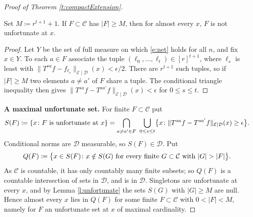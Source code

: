 \begin{proof}[Proof of Theorem \ref{t:compactExtension}]
\begin{lemma} \label{l:unfortunate}
Set $M \coloneqq r ^{t+1}+1$.  If $F \subset \mathcal C$ has $\lvert F\rvert \geq M$, then for almost every $x$, 
$F$ is not unfortunate at $x$.  
\end{lemma}

\begin{proof}
Let $Y$ be the set of full measure on which \eqref{e:net} holds for all $n$, and fix $x \in Y$.  
To each $a \in F$ associate the tuple $( \ell _0 , \ldots, \ell _t) \in [r] ^{t+1}$, where $\ell _s$ is least with 
$\lVert T^{sa}f - f _{\ell _s} \rVert _{\mathcal E\mid \mathcal D}(x)< \epsilon /2$.  
There are $r ^{t+1}$ such tuples, so if $\lvert F \rvert \geq M$ two elements $a \neq a'$ of $F$ share a tuple.  
The conditional triangle inequality then gives $\lVert T^{sa}f - T^{sa'}f\rVert _{\mathcal E\mid \mathcal D}(x)< \epsilon$ for $0 \leq s \leq t$. 
\end{proof}

\smallskip 
\noindent \textbf{A maximal unfortunate set.}  
For finite $F \subset \mathcal C$ put 
\begin{equation}
S(F) \coloneqq \{ x \colon F \textup{ is unfortunate at } x \} 
= \bigcap_{a \neq a' \in F} \ \bigcup_{0\leq s \leq t} 
\bigl\{ x \colon \lVert T^{sa}f-T^{sa'}f \rVert _{\mathcal E\mid \mathcal D}(x) \geq \epsilon \bigr\} .
\end{equation}
Conditional norms are $\mathcal D$ measurable, so $S(F) \in \mathcal D$.  Put 
\begin{equation}
Q(F) \coloneqq \bigl\{ x \in S(F) \colon x \notin S(G) \textup{ for every finite } G \subset \mathcal C \textup{ with } \lvert G\rvert > \lvert F\rvert \bigr\} . 
\end{equation}
As $\mathcal C$ is countable, it has only countably many finite subsets; so $Q(F)$ is a countable intersection of sets in $\mathcal D$, and is in $\mathcal D$.  
Singletons are unfortunate at every $x$, and by Lemma \ref{l:unfortunate} the sets $S(G)$ with $\lvert G\rvert \geq M$ are null.  
Hence almost every $x$ lies in $Q(F)$ for some finite $F \subset \mathcal C$ with $0< \lvert F\rvert < M$, namely for $F$ an unfortunate set at $x$ of maximal cardinality.  


\end{proof}
